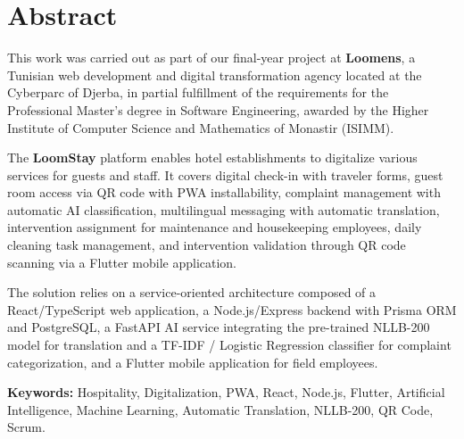 \chapter*{Abstract}

This work was carried out as part of our final-year project at \textbf{Loomens}, a Tunisian web development and digital transformation agency located at the Cyberparc of Djerba, in partial fulfillment of the requirements for the Professional Master's degree in Software Engineering, awarded by the Higher Institute of Computer Science and Mathematics of Monastir (ISIMM).

\medskip

The \textbf{LoomStay} platform enables hotel establishments to digitalize various services for guests and staff. It covers digital check-in with traveler forms, guest room access via QR code with PWA installability, complaint management with automatic AI classification, multilingual messaging with automatic translation, intervention assignment for maintenance and housekeeping employees, daily cleaning task management, and intervention validation through QR code scanning via a Flutter mobile application.

\medskip

The solution relies on a service-oriented architecture composed of a React/TypeScript web application, a Node.js/Express backend with Prisma ORM and PostgreSQL, a FastAPI AI service integrating the pre-trained NLLB-200 model for translation and a TF-IDF / Logistic Regression classifier for complaint categorization, and a Flutter mobile application for field employees.

\medskip

\textbf{Keywords:} Hospitality, Digitalization, PWA, React, Node.js, Flutter, Artificial Intelligence, Machine Learning, Automatic Translation, NLLB-200, QR Code, Scrum.
\newpage
